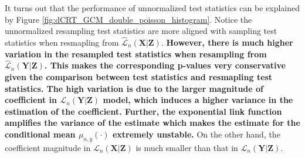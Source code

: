 \documentclass[aos]{imsart}
\theoremstyle{plain}
\theoremstyle{remark}
\newcommand{\prx}{\bm X}								%
\newcommand{\prz}{\bm Z}								%
\newcommand{\pry}{{\bm Y}}								%
\newcommand{\law}{\mathcal L}							%
\newcommand{\lawhat}{\widehat{\mathcal L}}				%
\newcommand{\GCM}{\textnormal{GCM}}						%
\newcommand{\ndCRThat}{\widehat{\textnormal{ndCRT}}}	%
\begin{document}

	It turns out that the performance of unnormalized test statistics can be explained by Figure \ref{fig:dCRT_GCM_double_poisson_histogram}. Notice the unnormalized resampling test statistics are more aligned with sampling test statistics when resmapling from $\lawhat_n(\prx|\prz)$. \textbf{However, there is much higher variation in the resampled test statistics when resampling from $\lawhat_n(\pry|\prz)$. This makes the corresponding p-values very conservative given the comparison between test statistics and resmapling test statistics. The high variation is due to the larger magnitude of coefficient in $\law_n(\pry|\prz)$ model, which induces a higher variance in the estimation of the coefficient. Further, the exponential link function amplifies the variance of the estimate which makes the estimate for the conditional mean $\mu_{n,y}(\cdot)$ extremely unstable.} On the other hand, the coefficient magnitude in $\law_n(\prx|\prz)$ is much smaller than that in $\law_n(\pry|\prz)$.
	
\end{document}
